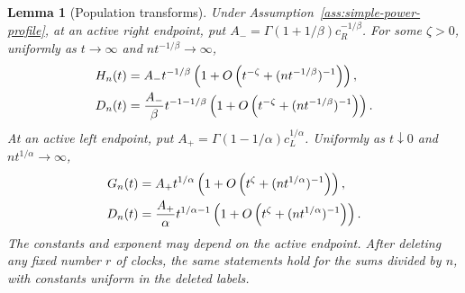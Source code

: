 \documentclass[11pt]{article}
\newtheorem{lemma}[theorem]{Lemma}
\theoremstyle{remark}
\theoremstyle{plain}
\begin{document}
\begin{lemma}[Population transforms]\label{lem:sp-populations}
Under Assumption~\ref{ass:simple-power-profile}, at an active right endpoint,
put $A_-=\Gamma(1+1/\beta)c_R^{-1/\beta}$.  For some $\zeta>0$,
uniformly as $t\to\infty$ and $nt^{-1/\beta}\to\infty$,
\begin{align}
 H_n(t)&=A_-t^{-1/\beta}
  \left(1+O\left(t^{-\zeta}+(nt^{-1/\beta})^{-1}\right)\right),\notag\\
 D_n(t)&=\frac{A_-}{\beta}t^{-1-1/\beta}
  \left(1+O\left(t^{-\zeta}+(nt^{-1/\beta})^{-1}\right)\right).
 \label{eq:sp-slow-transforms}
\end{align}
At an active left endpoint, put
$A_+=\Gamma(1-1/\alpha)c_L^{1/\alpha}$.  Uniformly as $t\downarrow0$
and $nt^{1/\alpha}\to\infty$,
\begin{align}
 G_n(t)&=A_+t^{1/\alpha}
  \left(1+O\left(t^\zeta+(nt^{1/\alpha})^{-1}\right)\right),\notag\\
 D_n(t)&=\frac{A_+}{\alpha}t^{1/\alpha-1}
  \left(1+O\left(t^\zeta+(nt^{1/\alpha})^{-1}\right)\right).
 \label{eq:sp-fast-transforms}
\end{align}
The constants and exponent may depend on the active endpoint.
After deleting any fixed number $r$ of clocks, the same statements hold
for the sums divided by $n$, with constants uniform in the deleted labels.
\end{lemma}
\end{document}
